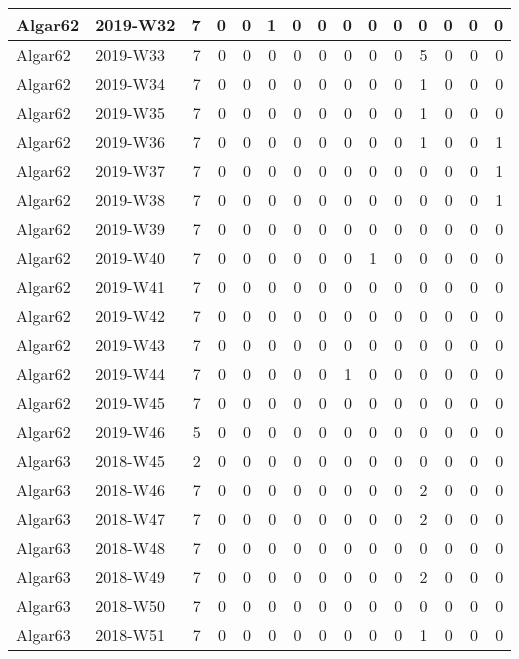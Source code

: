 \documentclass[]{book}
\begin{document}
\begin{table}
\begin{tabular}[t]{l|l|r|r|r|r|r|r|r|r|r|r|r|r|r}
\hline
Algar62 & 2019-W32 & 7 & 0 & 0 & 1 & 0 & 0 & 0 & 0 & 0 & 0 & 0 & 0 & 0\\
\hline
Algar62 & 2019-W33 & 7 & 0 & 0 & 0 & 0 & 0 & 0 & 0 & 0 & 5 & 0 & 0 & 0\\
\hline
Algar62 & 2019-W34 & 7 & 0 & 0 & 0 & 0 & 0 & 0 & 0 & 0 & 1 & 0 & 0 & 0\\
\hline
Algar62 & 2019-W35 & 7 & 0 & 0 & 0 & 0 & 0 & 0 & 0 & 0 & 1 & 0 & 0 & 0\\
\hline
Algar62 & 2019-W36 & 7 & 0 & 0 & 0 & 0 & 0 & 0 & 0 & 0 & 1 & 0 & 0 & 1\\
\hline
Algar62 & 2019-W37 & 7 & 0 & 0 & 0 & 0 & 0 & 0 & 0 & 0 & 0 & 0 & 0 & 1\\
\hline
Algar62 & 2019-W38 & 7 & 0 & 0 & 0 & 0 & 0 & 0 & 0 & 0 & 0 & 0 & 0 & 1\\
\hline
Algar62 & 2019-W39 & 7 & 0 & 0 & 0 & 0 & 0 & 0 & 0 & 0 & 0 & 0 & 0 & 0\\
\hline
Algar62 & 2019-W40 & 7 & 0 & 0 & 0 & 0 & 0 & 0 & 1 & 0 & 0 & 0 & 0 & 0\\
\hline
Algar62 & 2019-W41 & 7 & 0 & 0 & 0 & 0 & 0 & 0 & 0 & 0 & 0 & 0 & 0 & 0\\
\hline
Algar62 & 2019-W42 & 7 & 0 & 0 & 0 & 0 & 0 & 0 & 0 & 0 & 0 & 0 & 0 & 0\\
\hline
Algar62 & 2019-W43 & 7 & 0 & 0 & 0 & 0 & 0 & 0 & 0 & 0 & 0 & 0 & 0 & 0\\
\hline
Algar62 & 2019-W44 & 7 & 0 & 0 & 0 & 0 & 0 & 1 & 0 & 0 & 0 & 0 & 0 & 0\\
\hline
Algar62 & 2019-W45 & 7 & 0 & 0 & 0 & 0 & 0 & 0 & 0 & 0 & 0 & 0 & 0 & 0\\
\hline
Algar62 & 2019-W46 & 5 & 0 & 0 & 0 & 0 & 0 & 0 & 0 & 0 & 0 & 0 & 0 & 0\\
\hline
Algar63 & 2018-W45 & 2 & 0 & 0 & 0 & 0 & 0 & 0 & 0 & 0 & 0 & 0 & 0 & 0\\
\hline
Algar63 & 2018-W46 & 7 & 0 & 0 & 0 & 0 & 0 & 0 & 0 & 0 & 2 & 0 & 0 & 0\\
\hline
Algar63 & 2018-W47 & 7 & 0 & 0 & 0 & 0 & 0 & 0 & 0 & 0 & 2 & 0 & 0 & 0\\
\hline
Algar63 & 2018-W48 & 7 & 0 & 0 & 0 & 0 & 0 & 0 & 0 & 0 & 0 & 0 & 0 & 0\\
\hline
Algar63 & 2018-W49 & 7 & 0 & 0 & 0 & 0 & 0 & 0 & 0 & 0 & 2 & 0 & 0 & 0\\
\hline
Algar63 & 2018-W50 & 7 & 0 & 0 & 0 & 0 & 0 & 0 & 0 & 0 & 0 & 0 & 0 & 0\\
\hline
Algar63 & 2018-W51 & 7 & 0 & 0 & 0 & 0 & 0 & 0 & 0 & 0 & 1 & 0 & 0 & 0\\

\end{tabular}
\end{table}
\end{document}
